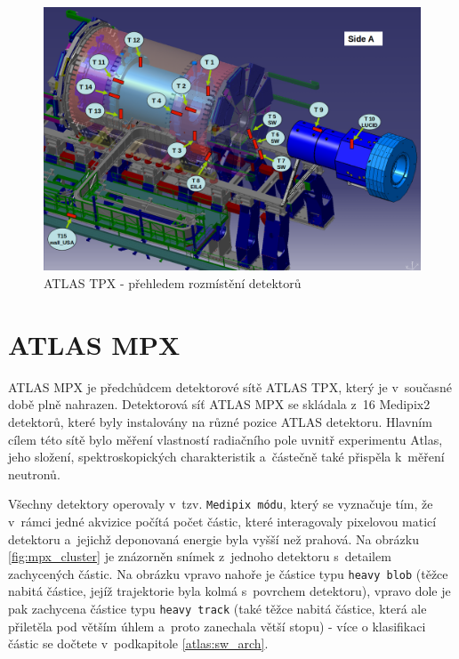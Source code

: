 \begin{figure}[ht]
	\begin{center}
		\includegraphics[width=12cm]{figures/tpx_positions.png}
		\caption{ATLAS TPX - přehledem rozmístění detektorů}
		\label{fig:tpx_positions}
	\end{center}
\end{figure}

\section{ATLAS MPX}\label{atlas:mpx}
ATLAS MPX\cite{Vykydal200935}\cite{atlasmpx} je předchůdcem detektorové sítě ATLAS TPX, který je v~současné době plně nahrazen. Detektorová síť ATLAS MPX se skládala z~16 Medipix2 detektorů, které byly instalovány na různé pozice ATLAS detektoru. Hlavním cílem této sítě bylo měření vlastností radiačního pole uvnitř experimentu Atlas, jeho složení, spektroskopických charakteristik a~částečně také přispěla k~měření neutronů. 


Všechny detektory operovaly v~tzv. \texttt{Medipix módu}, který se vyznačuje tím, že v~rámci jedné akvizice počítá počet částic, které interagovaly pixelovou maticí detektoru a~jejichž deponovaná energie byla vyšší než prahová. Na obrázku \ref{fig:mpx_cluster} je znázorněn snímek z~jednoho detektoru s~detailem zachycených částic. Na obrázku vpravo nahoře je částice typu \texttt{heavy blob} (těžce nabitá částice, jejíž trajektorie byla kolmá s~povrchem detektoru), vpravo dole je pak zachycena částice typu \texttt{heavy track} (také těžce nabitá částice, která ale přiletěla pod větším úhlem a~proto zanechala větší stopu) - více o klasifikaci částic se dočtete v~podkapitole \ref{atlas:sw_arch}.


